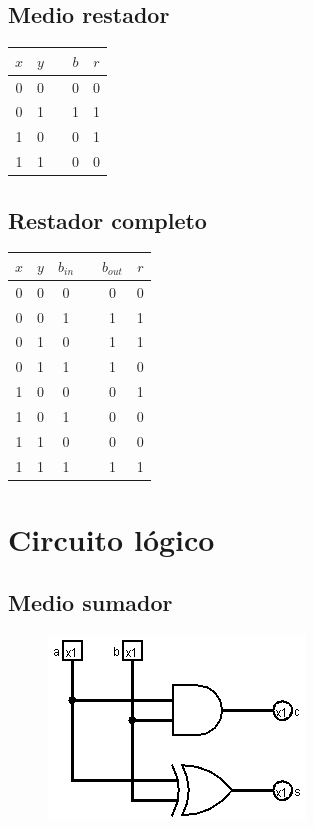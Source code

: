 \documentclass[11pt]{article}
\begin{document}
	\subsection{Medio restador}
	\begin{table}[H]
	    \centering
	    \begin{tabular}{|c|c|c|c|c|}
	         \hline
	         $x$ & $y$ & & $b$ & $r$ \\ \hline
	         0 & 0 & & 0 & 0 \\ \hline
	         0 & 1 & & 1 & 1 \\ \hline
	         1 & 0 & & 0 & 1 \\ \hline
	         1 & 1 & & 0 & 0 \\ \hline
	    \end{tabular}
	\end{table}
	
	\subsection{Restador completo}
	\begin{table}[H]
	    \centering
	    \begin{tabular}{|c|c|c|c|c|c|}
	         \hline
	         $x$ & $y$ & $b_{in}$ & & $b_{out}$ & $r$ \\ \hline
	         0 & 0 & 0 & & 0 & 0 \\ \hline
	         0 & 0 & 1 & & 1 & 1 \\ \hline
	         0 & 1 & 0 & & 1 & 1 \\ \hline
	         0 & 1 & 1 & & 1 & 0 \\ \hline
	         1 & 0 & 0 & & 0 & 1 \\ \hline
	         1 & 0 & 1 & & 0 & 0 \\ \hline
	         1 & 1 & 0 & & 0 & 0 \\ \hline
	         1 & 1 & 1 & & 1 & 1 \\ \hline
	    \end{tabular}
	\end{table}
	
	\section{Circuito lógico}
	\subsection{Medio sumador}
	\begin{figure}[H]
		\centering
		\includegraphics[scale=0.7]{halfAdder.png}
	\end{figure}
	
\end{document}
